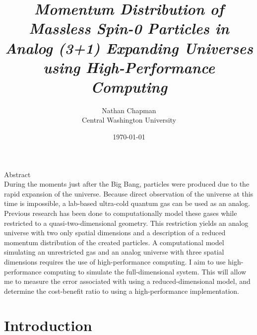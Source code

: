 \documentclass{article}
\title{\Large \vspace{-0.625in} \emph{Momentum Distribution of Massless Spin-0 Particles in Analog (3+1) Expanding Universes using High-Performance Computing} \vspace{-0.15in}}
\author{Nathan Chapman \\ {\normalsize Central Washington University}}
\date{\vspace{-0.1in}\today}
\begin{document}
\maketitle

\begin{center}
    Abstract \\
    During the moments just after the Big Bang, particles were produced due to the rapid expansion of the universe. Because direct observation of the universe at this time is impossible, a lab-based ultra-cold quantum gas can be used as an analog.  Previous research has been done to computationally model these gases while restricted to a quasi-two-dimensional geometry.  This restriction yields an analog universe with two only spatial dimensions and a description of a reduced momentum distribution of the created particles.  A computational model simulating an unrestricted gas and an analog universe with three spatial dimensions requires the use of high-performance computing.  I aim to use high-performance computing to simulate the full-dimensional system. This will allow me to measure the error associated with using a reduced-dimensional model, and determine the cost-benefit ratio to using a high-performance implementation.
        
        
        
\end{center}

\tableofcontents

\pagebreak

\section{Introduction} \label{sec:intro}
\end{document}
